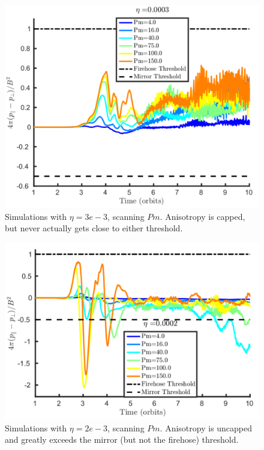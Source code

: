 \begin{figure}[h]
  \begin{center}  
    \includegraphics[width=.9\textwidth, angle=0.]{img/pLimiter-eta3-PmSel1_Sharma.pdf}
  \end{center}
  \caption{Simulations with $\eta=3e-3$, scanning $Pm$. Anisotropy is capped, but never actually gets close to either threshold.}
  \label{fig:eta2p}
\end{figure}

\begin{figure}[h]
  \begin{center}  
    \includegraphics[width=.9\textwidth, angle=0.]{img/npLimiter-eta2-PmSel1_Sharma.pdf}
  \end{center}
  \caption{Simulations with $\eta=2e-3$, scanning $Pm$. Anisotropy is uncapped and greatly exceeds the mirror (but not the firehose) threshold. }
  \label{fig:eta2np}
\end{figure}


